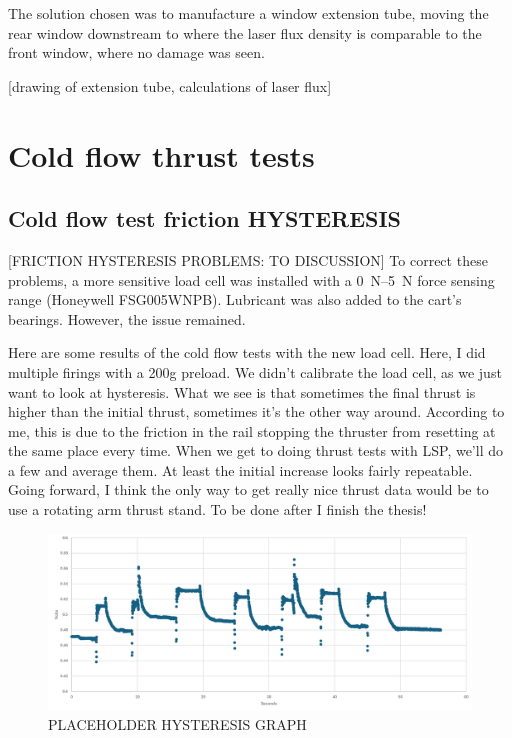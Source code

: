         The solution chosen was to manufacture a window extension tube, moving the rear window downstream to where the laser flux density is comparable to the front window, where no damage was seen.

        [drawing of extension tube, calculations of laser flux]

\section{Cold flow thrust tests}

    \subsection{Cold flow test friction HYSTERESIS}

        [FRICTION HYSTERESIS PROBLEMS: TO DISCUSSION] To correct these problems, a more sensitive load cell was installed with a \qtyrange{0}{5}{N} force sensing range (Honeywell FSG005WNPB). Lubricant was also added to the cart's bearings. However, the issue remained.

        Here are some results of the cold flow tests with the new load cell. Here, I did multiple firings with a 200g preload. We didn't calibrate the load cell, as we just want to look at hysteresis. What we see is that sometimes the final thrust is higher than the initial thrust, sometimes it's the other way around. According to me, this is due to the friction in the rail stopping the thruster from resetting at the same place every time. When we get to doing thrust tests with LSP, we'll do a few and average them. At least the initial increase looks fairly repeatable.
        Going forward, I think the only way to get really nice thrust data would be to use a rotating arm thrust stand. To be done after I finish the thesis! 

        \begin{figure}[h]
            \centering
            \includegraphics[width=0.8\linewidth]{assets/5 discussion/hysterisis.png}
            \caption{PLACEHOLDER HYSTERESIS GRAPH}
            \label{fig:double choke sizing}
        \end{figure}

